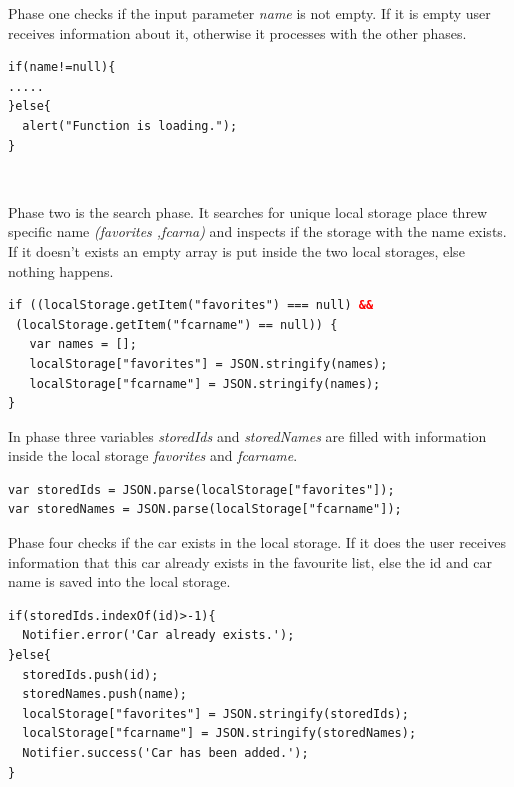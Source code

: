 Phase one checks if the input parameter \textit{name} is not empty. If it is empty user receives information about it, otherwise it processes with the other phases.

\begin{lstlisting}[language=html, caption= 
Phase one,captionpos=b]
if(name!=null){
.....
}else{
  alert("Function is loading.");
}
\end{lstlisting}
\
\

Phase two is the search phase. It searches for unique local storage place threw specific name \textit{(favorites ,fcarna)} and inspects if the storage with the name exists. If it doesn't exists an empty array is put inside the two local storages, else nothing happens.
\\

\begin{lstlisting}[language=html, caption= 
Phase two,captionpos=b]
if ((localStorage.getItem("favorites") === null) &&
 (localStorage.getItem("fcarname") == null)) {
   var names = [];
   localStorage["favorites"] = JSON.stringify(names);	
   localStorage["fcarname"] = JSON.stringify(names);
}
\end{lstlisting}


In phase three variables \textit{storedIds} and \textit{storedNames} are filled with information inside the local storage \textit{favorites} and \textit{fcarname}.
\\

\begin{lstlisting}[language=html, caption= 
Phase three,captionpos=b]
var storedIds = JSON.parse(localStorage["favorites"]);
var storedNames = JSON.parse(localStorage["fcarname"]);
\end{lstlisting}

Phase four checks if the car exists in the local storage. If it does the user receives information that this car already exists in the favourite list, else the id and car name is saved into the local storage.
\\

\begin{lstlisting}[language=html, caption= 
Phase four,captionpos=b]
if(storedIds.indexOf(id)>-1){
  Notifier.error('Car already exists.');
}else{
  storedIds.push(id);
  storedNames.push(name);
  localStorage["favorites"] = JSON.stringify(storedIds);
  localStorage["fcarname"] = JSON.stringify(storedNames);
  Notifier.success('Car has been added.');
}
\end{lstlisting}

